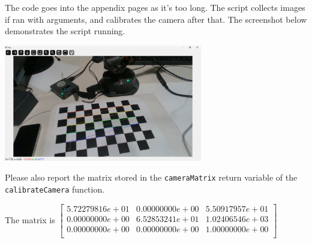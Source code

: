 The code goes into the appendix pages as it's too long. The script collects images if ran with arguments, and calibrates the camera after that. The screenshot below demonstrates the script running.

\begin{center}
    \includegraphics[height=2in]{image/5d_calibration.png}
\end{center}


Please also report the matrix stored in the \texttt{cameraMatrix} return variable of the \texttt{calibrateCamera} function.

The matrix is 
$\begin{bmatrix}
    5.72279816e+01 & 0.00000000e+00 & 5.50917957e+01 \\
    0.00000000e+00 & 6.52853241e+01 & 1.02406546e+03 \\
    0.00000000e+00 & 0.00000000e+00 & 1.00000000e+00 \\
\end{bmatrix}$

\newpage
